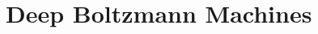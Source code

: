 \documentclass[a4paper,10pt]{article}
\begin{document}
\section{Deep Boltzmann Machines}






%
\end{document}
